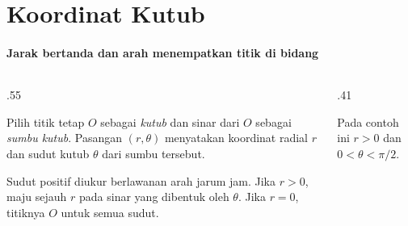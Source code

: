 \documentclass{../../kalkulus-ppt}
\begin{document}
\section{Koordinat Kutub}

\begin{frame}{\insertsection}
    \framesubtitle{Jarak bertanda dan arah menempatkan titik di bidang}
    \begin{columns}[c,onlytextwidth]
        \begin{column}{.55\textwidth}
            \begin{definisi}
                Pilih titik tetap $O$ sebagai \emph{kutub} dan sinar
                dari $O$ sebagai \emph{sumbu kutub}. Pasangan
                $(r,\theta)$ menyatakan koordinat radial $r$
                dan sudut kutub $\theta$ dari sumbu tersebut.
            \end{definisi}
            Sudut positif diukur berlawanan arah jarum jam.
            Jika $r>0$, maju sejauh $r$ pada sinar yang
            dibentuk oleh $\theta$. Jika $r=0$, titiknya $O$
            untuk semua sudut.
        \end{column}
        \begin{column}{.41\textwidth}
            \centering
            \par
            \small Pada contoh ini $r>0$ dan $0<\theta<\pi/2$.
        \end{column}
    \end{columns}
\end{frame}
\end{document}
